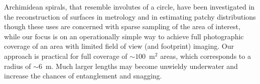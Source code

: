 Archimidean spirals, that resemble involutes of a circle, have been investigated in the reconstruction of surfaces in metrology \cite{Wieczorowski_2001} and in estimating patchy distributions \cite{Kalikhman_2006} though these uses are concerned with sparse sampling of the area of interest, while our focus is on an operationally simple way to achieve full photographic coverage of an area with limited field of view (and footprint) imaging. Our approach is practical for full coverage of $\sim{100}$~m$^{2}$ areas, which corresponds to a radius of $\sim{6}$~m. Much larger lengths may become unwieldy underwater and increase the chances of entanglement and snagging.

  